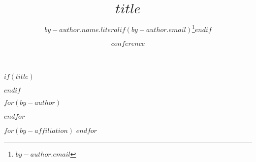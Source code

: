 
$if(title)$
\title{$title$}
$endif$

$for(by-author)$
\author[$for(by-author.affiliations/allbutlast)$$it.number$,$endfor$$for(by-author.affiliations/last)$$it.number$$endfor$]{$by-author.name.literal$$if(by-author.email)$\thanks{$by-author.email$}$endif$}
$endfor$

$for(by-affiliation)$
$endfor$

\date{$conference$}

\renewcommand\Authands{ and } %